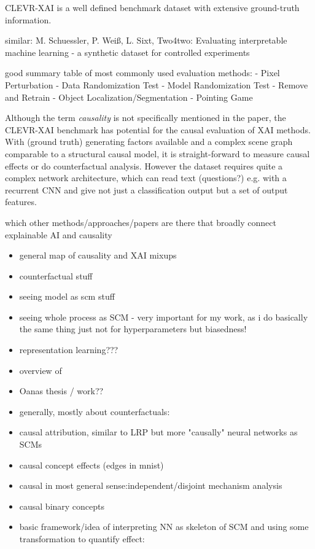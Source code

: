 {CLEVR-XAI \cite{Arras2022} is a well defined benchmark dataset with extensive ground-truth information. 

similar: M. Schuessler, P. Weiß, L. Sixt, Two4two: Evaluating interpretable machine learning - a synthetic dataset for controlled experiments

good summary table of most commonly used evaluation methods:
- Pixel Perturbation
- Data Randomization Test
- Model Randomization Test
- Remove and Retrain
- Object Localization/Segmentation
- Pointing Game

Although the term \textit{causality} is not specifically mentioned in the paper, the CLEVR-XAI benchmark has potential for the causal evaluation of XAI methods. With (ground truth) generating factors available and a complex scene graph comparable to a structural causal model, it is straight-forward to measure causal effects or do counterfactual analysis. However the dataset requires quite a complex network architecture, which can read text (questions?) e.g. with a recurrent CNN and give not just a classification output but a set of output features.
}
      {\color{red} which other methods/approaches/papers are there that broadly connect explainable AI and causality }
\begin{itemize}
      \item general map of causality and XAI mixups
      \item counterfactual stuff
      \item seeing model as scm stuff \cite{Chattopadhyay2019}
      \item seeing whole process as SCM \cite{Karimi2023} - very important for my work, as i do basically the same thing just not for hyperparameters but biasedness!
      \item representation learning??? 
      \item overview of \cite{Schoelkopf2019}
      \item Oanas thesis / work??
\end{itemize}

\begin{itemize}
      \item generally, mostly about counterfactuals: \cite{Moraffah2020a}
      \item causal attribution, similar to LRP but more "causally" neural networks as SCMs \cite{Chattopadhyay2019}
      \item causal concept effects (edges in mnist) \cite{Goyal2019}
      \item causal in most general sense:independent/disjoint mechanism analysis \cite{Leemann2023} \cite{Leemann2022}
      \item causal binary concepts \cite{Tran2022}
      \item basic framework/idea of interpreting NN as skeleton of SCM and using some transformation to quantify effect:\cite{Narendra2018}
\end{itemize}



